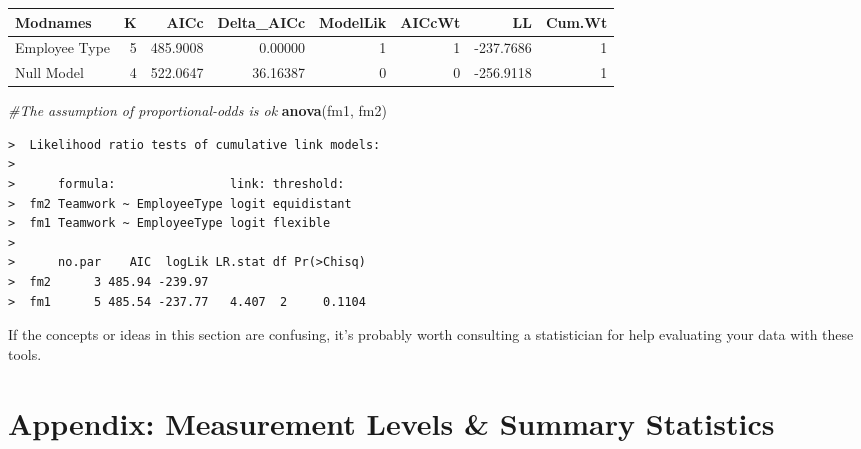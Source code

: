 \documentclass[]{book}
\newenvironment{Shaded}{\begin{snugshade}}{\end{snugshade}}
\newcommand{\KeywordTok}[1]{\textcolor[rgb]{0.13,0.29,0.53}{\textbf{{#1}}}}
\newcommand{\CommentTok}[1]{\textcolor[rgb]{0.56,0.35,0.01}{\textit{{#1}}}}
\newcommand{\NormalTok}[1]{{#1}}
\begin{document}
\begin{tabular}{l|r|r|r|r|r|r|r}
\hline
Modnames & K & AICc & Delta\_AICc & ModelLik & AICcWt & LL & Cum.Wt\\
\hline
Employee Type & 5 & 485.9008 & 0.00000 & 1 & 1 & -237.7686 & 1\\
\hline
Null Model & 4 & 522.0647 & 36.16387 & 0 & 0 & -256.9118 & 1\\
\hline
\end{tabular}

\begin{Shaded}
\begin{Highlighting}[]
\CommentTok{#The assumption of proportional-odds is ok }
\KeywordTok{anova}\NormalTok{(fm1, fm2)}
\end{Highlighting}
\end{Shaded}

\begin{verbatim}
>  Likelihood ratio tests of cumulative link models:
>   
>      formula:                link: threshold: 
>  fm2 Teamwork ~ EmployeeType logit equidistant
>  fm1 Teamwork ~ EmployeeType logit flexible   
>  
>      no.par    AIC  logLik LR.stat df Pr(>Chisq)
>  fm2      3 485.94 -239.97                      
>  fm1      5 485.54 -237.77   4.407  2     0.1104
\end{verbatim}

If the concepts or ideas in this section are confusing, it's probably
worth consulting a statistician for help evaluating your data with these
tools.

\chapter*{Appendix: Measurement Levels \& Summary
Statistics}\label{appendix-measurement-levels-summary-statistics}
\end{document}
